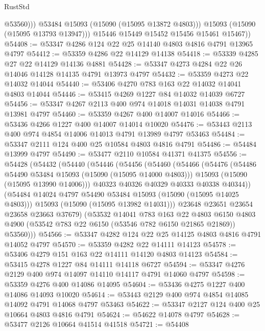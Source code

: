 \begin{lexlean}{RustStd}
\begin{coremodule}
                  @53560)))
            @53484
            @15093
            (@15090 (@15095 @13872 @4803)))
          @15093
          (@15090 (@15095 @13793 @13947)))
        @15446
        @15449
        @15452
        @15456
        @15461
        @15467))
@54408 := @53347 @4286 @124 @22 @25 @14140 @4803 @4816 @4791 @13965 @4797
@54412 := @53359 @4286 @22 @14129 @14138
@54418 := @53339 @4285 @27 @22 @14129 @14136 @4881
@54428 := @53347 @4273 @4284 @22 @26 @14046 @14128 @14135 @4791 @13973 @4797
@54432 := @53359 @4273 @22 @14032 @14044
@54440 := @53406 @4270 @783 @163 @22 @14032 @14041 @4803 @14044
@54446 := @53415 @4269 @1227 @84 @14032 @14039 @6727
@54456 := @53347 @4267 @2113 @400 @974 @14018 @14031 @14038 @4791 @13981 @4797
@54460 := @53359 @4267 @400 @14007 @14016
@54466 := @53436 @4266 @1227 @400 @14007 @14014 @10020
@54476 := @53443 @2113 @400 @974 @4854 @14006 @14013 @4791 @13989 @4797 @53463
@54484 := @53347 @2111 @124 @400 @25 @10584 @4803 @4816 @4791
@54486 := @54484 @13999 @4797
@54490 := @53477 @2110 @10584 @41371 @41375
@54556 := @54428
    (@54432
      (@54440
        (@54446
          (@54456
            (@54460
              (@54466
                (@54476
                  (@54486 @54490 @53484 @15093 (@15090 (@15095 @14000 @4803)))
                  @15093
                  (@15090 (@15095 @13990 @14006)))
                @40323
                @40326
                @40329
                @40333
                @40338
                @40344))
            (@54484 @14024 @4797 @54490 @53484 @15093 (@15090 (@15095 @14025 @4803)))
            @15093
            (@15090 (@15095 @13982 @14031)))
          @23648
          @23651
          @23654
          @23658
          @23663
          @37679)
        (@53532
          @14041
          @783
          @163
          @22
          @4803
          @6150
          @4803
          @4900
          (@53542 @783 @22 @6150 (@53546 @782 @6150 @21865 @21869))
          @53560)))
@54566 := @53347 @4282 @124 @22 @25 @14125 @4803 @4816 @4791 @14052 @4797
@54570 := @53359 @4282 @22 @14111 @14123
@54578 := @53406 @4279 @151 @163 @22 @14111 @14120 @4803 @14123
@54584 := @53415 @4278 @1227 @84 @14111 @14118 @6727
@54594 := @53347 @4276 @2129 @400 @974 @14097 @14110 @14117 @4791 @14060 @4797
@54598 := @53359 @4276 @400 @14086 @14095
@54604 := @53436 @4275 @1227 @400 @14086 @14093 @10020
@54614 := @53443 @2129 @400 @974 @4854 @14085 @14092 @4791 @14068 @4797 @53463
@54622 := @53347 @2127 @124 @400 @25 @10664 @4803 @4816 @4791
@54624 := @54622 @14078 @4797
@54628 := @53477 @2126 @10664 @41514 @41518
@54721 := @54408

\end{coremodule}
\end{lexlean}
